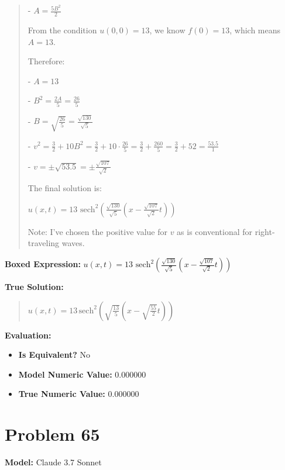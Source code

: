 \documentclass{article}
\begin{document}
\begin{quote}
- $A = \frac{5B^2}{2}$



From the condition $u(0,0) = 13$, we know $f(0) = 13$, which means $A = 13$.



Therefore:

- $A = 13$

- $B^2 = \frac{2A}{5} = \frac{26}{5}$

- $B = \sqrt{\frac{26}{5}} = \frac{\sqrt{130}}{\sqrt{5}}$

- $v^2 = \frac{3}{2} + 10B^2 = \frac{3}{2} + 10\cdot\frac{26}{5} = \frac{3}{2} + \frac{260}{5} = \frac{3}{2} + 52 = \frac{53.5}{1}$

- $v = \pm\sqrt{53.5} = \pm\frac{\sqrt{107}}{\sqrt{2}}$



The final solution is:



$\boxed{u(x,t) = 13 \text{ sech}^2\left(\frac{\sqrt{130}}{\sqrt{5}}(x-\frac{\sqrt{107}}{\sqrt{2}}t)\right)}$



Note: I've chosen the positive value for $v$ as is conventional for right-traveling waves.
\end{quote}
\textbf{Boxed Expression:} $u(x,t) = 13 \text{ sech}^2\left(\frac{\sqrt{130}}{\sqrt{5}}(x-\frac{\sqrt{107}}{\sqrt{2}}t)\right)$

\textbf{True Solution:}
\begin{quote}
$u(x,t) = 13\,\mathrm{sech}^2\left(\sqrt{\frac{13}{5}}\left(x-\sqrt{\frac{55}{2}}t\right)\right)$
\end{quote}

\textbf{Evaluation:}
\begin{itemize}
\item \textbf{Is Equivalent?} No
\item \textbf{Model Numeric Value:} 0.000000
\item \textbf{True Numeric Value:} 0.000000
\end{itemize}
\vspace{1cm}
\section*{Problem 65}
\textbf{Model:} Claude 3.7 Sonnet
\end{document}
